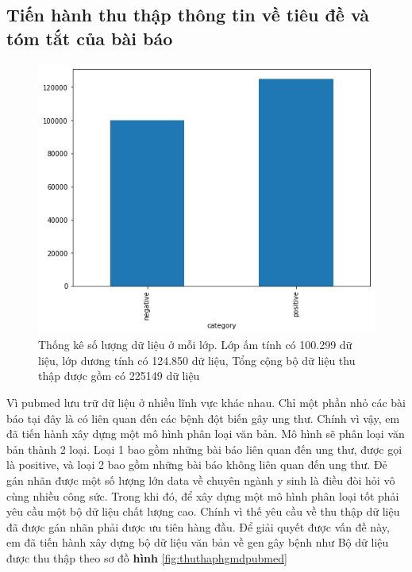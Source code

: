 \documentclass[../DoAn.tex]{subfiles}
\begin{document}
\subsection{Tiến hành thu thập thông tin về tiêu đề và tóm tắt của bài báo}
\begin{figure}
\centering
\includegraphics[width=1\linewidth]{Hinh_ve/Chuong3_dataCls.png}
\caption{Thống kê số lượng dữ liệu ở mỗi lớp. Lớp ấm tính có 100.299 dữ liệu, lớp dương tính có 124.850 dữ liệu, Tổng cộng bộ dữ liệu thu thập được gồm có 225149 dữ liệu}
\label{fig:3cls}
\end{figure}


Vì pubmed lưu trữ dữ liệu ở nhiều lĩnh vực khác nhau. Chỉ một phần nhỏ các bài báo tại đây là có liên quan đến các bệnh đột biến gây ung thư. Chính vì vậy, em đã tiến hành xây dựng một mô hình phân loại văn bản. Mô hình sẽ phân loại văn bản thành 2 loại. Loại 1 bao gồm những bài báo liên quan đến ung thư, được gọi là positive, và loại 2 bao gồm những bài báo không liên quan đến ung thư. Đẻ gán nhãn được một số lượng lớn data về chuyên ngành y sinh là điều đòi hỏi vô cùng nhiều công sức. Trong khi đó, để xây dựng một mô hình phân loại tốt phải yêu cầu một bộ dữ liệu chất lượng cao. Chính vì thế yêu cầu về thu thập dữ liệu đã được gán nhãn phải được ưu tiên hàng đầu. Để giải quyết được vấn đề này, em đã tiến hành xây dựng bộ dữ liệu văn bản về gen gây bệnh như 
Bộ dữ liệu được thu thập theo sơ đồ \textbf{hình} \ref{fig:thuthaphgmdpubmed}
\end{document}
